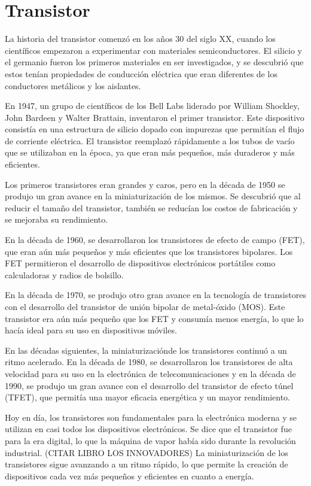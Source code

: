\documentclass{article}
\begin{document}
\section*{Transistor}

La historia del transistor comenzó en los años 30 del siglo XX, cuando los científicos empezaron a experimentar
con materiales semiconductores. El silicio y el germanio fueron los primeros materiales en ser investigados, 
y se descubrió que estos tenían propiedades de conducción eléctrica que eran diferentes de los conductores metálicos
y los aislantes.

En 1947, un grupo de científicos de los Bell Labs liderado por William Shockley, John Bardeen y Walter Brattain, 
inventaron el primer transistor. Este dispositivo consistía en una estructura de silicio dopado con impurezas que 
permitían el flujo de corriente eléctrica. El transistor reemplazó rápidamente a los tubos de vacío 
que se utilizaban en la época, ya que eran más pequeños, más duraderos y más eficientes.

Los primeros transistores eran grandes y caros, pero en la década de 1950 se produjo un gran avance en la miniaturización
de los mismos. Se descubrió que al reducir el tamaño del transistor, también se reducían los costos de fabricación y se 
mejoraba su rendimiento.

En la década de 1960, se desarrollaron los transistores de efecto de campo (FET), que eran aún más 
pequeños y más eficientes que los transistores bipolares. Los FET permitieron el desarrollo de dispositivos 
electrónicos portátiles como calculadoras y radios de bolsillo. 

En la década de 1970, se produjo otro gran avance en la tecnología de transistores con el desarrollo del 
transistor de unión bipolar de metal-óxido (MOS). Este transistor era aún más pequeño que los FET y consumía 
menos energía, lo que lo hacía ideal para su uso en dispositivos móviles. 

En las décadas siguientes, la miniaturizaciónde los transistores continuó a un ritmo acelerado. En la década de 1980, 
se desarrollaron los transistores de alta velocidad para su uso en la electrónica de telecomunicaciones y en la década
de 1990, se produjo un gran avance con el desarrollo del transistor de efecto túnel (TFET), que permitía una mayor 
eficacia energética y un mayor rendimiento.

Hoy en día, los transistores son fundamentales para la electrónica moderna y se utilizan en casi todos los 
dispositivos electrónicos. Se dice que el transistor fue para la era digital, lo que la máquina de vapor había
sido durante la revolución industrial. (CITAR LIBRO LOS INNOVADORES) 
La miniaturización de los transistores sigue avanzando a un ritmo rápido, lo que permite la creación de 
dispositivos cada vez más pequeños y eficientes en cuanto a energía.
\end{document}
